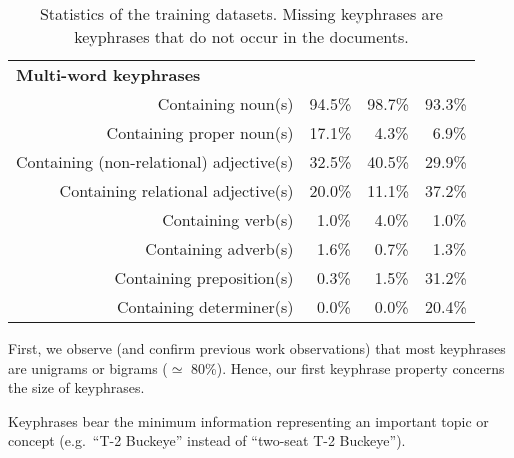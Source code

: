 \begin{table}
\begin{tabular}{lr|ccc}
        \hline
        \multicolumn{2}{l|}{\textbf{Multi-word keyphrases}}\\
        \multicolumn{2}{r|}{Containing noun(s)} & 94.5\% & 98.7\% & 93.3\%\\
        \multicolumn{2}{r|}{Containing proper noun(s)} & 17.1\% & $~~$4.3\% & $~~$6.9\%\\
        \multicolumn{2}{r|}{Containing (non-relational) adjective(s)} & 32.5\% & 40.5\% & 29.9\%\\
        \multicolumn{2}{r|}{Containing relational adjective(s)} & 20.0\% & 11.1\% & 37.2\%\\
        \multicolumn{2}{r|}{Containing verb(s)} & $~~$1.0\% & $~~$4.0\% & $~~$1.0\%\\
        \multicolumn{2}{r|}{Containing adverb(s)} & $~~$1.6\% & $~~$0.7\% & $~~$1.3\%\\
        \multicolumn{2}{r|}{Containing preposition(s)} & $~~$0.3\% & $~~$1.5\% & 31.2\%\\
        \multicolumn{2}{r|}{Containing determiner(s)} & $~~$0.0\% & $~~$0.0\% & 20.4\%\\
        \bottomrule
      \end{tabular}
      \caption{Statistics of the training datasets. Missing keyphrases are
               keyphrases that do not occur in the documents.
               \label{tab:train_dataset_statistics}}
    \end{table}

    First, we observe (and confirm previous work observations) that most
    keyphrases are unigrams or bigrams ($\simeq$ 80\%). Hence, our first
    keyphrase property concerns the size of keyphrases.
    
    \begin{property}\label{prop:informativity}
      Keyphrases bear the minimum information representing an important topic or
      concept (e.g.~``T-2 Buckeye'' instead of ``two-seat T-2 Buckeye'').
    \end{property}

